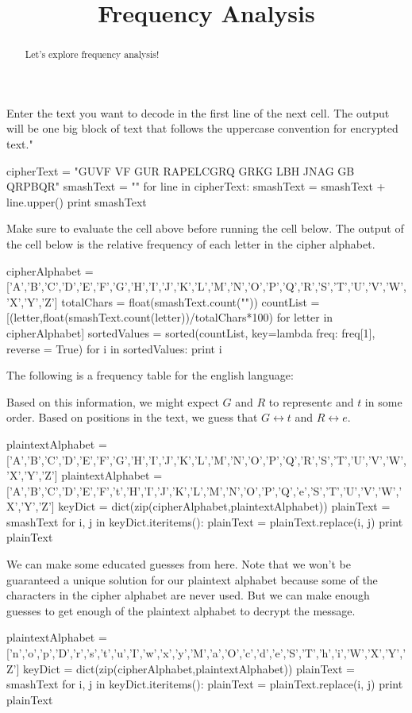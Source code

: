 \documentclass[handout]{ximera}
\title{Frequency Analysis}
\begin{document}
\begin{abstract}{Let's explore frequency analysis!}\end{abstract}
\maketitle

Enter the text you want to decode in the first line of the next cell.  The output will be one big block of text that follows the uppercase convention for encrypted text."

\begin{python}
cipherText = "GUVF VF GUR RAPELCGRQ GRKG LBH JNAG GB QRPBQR"
smashText =  ""
for line in cipherText:
	smashText = smashText + line.upper()
print smashText
\end{python}
Make sure to evaluate the cell above before running the cell below.  The output of the cell below is the relative frequency of each letter in the cipher alphabet.

\begin{python}
cipherAlphabet = ['A','B','C','D','E','F','G','H','I','J','K','L','M','N','O','P','Q','R','S','T','U','V','W','X','Y','Z']
totalChars = float(smashText.count(""))
countList = [(letter,float(smashText.count(letter))/totalChars*100) for letter in cipherAlphabet]
sortedValues = sorted(countList, key=lambda freq: freq[1], reverse = True)
for i in sortedValues:
	print i
\end{python}

The following is a frequency table for the english language:


Based on this information, we might expect $G$ and $R$ to represent$ e$ and $t$ in some order.  Based on positions in the text, we guess that $G \leftrightarrow t$ and $R \leftrightarrow e$.

\begin{python}
plaintextAlphabet = ['A','B','C','D','E','F','G','H','I','J','K','L','M','N','O','P','Q','R','S','T','U','V','W','X','Y','Z']
plaintextAlphabet = ['A','B','C','D','E','F','t','H','I','J','K','L','M','N','O','P','Q','e','S','T','U','V','W','X','Y','Z']
keyDict = dict(zip(cipherAlphabet,plaintextAlphabet))
plainText = smashText
for i, j in keyDict.iteritems():
	plainText = plainText.replace(i, j)
print plainText
\end{python}

We can make some educated guesses from here. Note that we won't be guaranteed a unique solution for our plaintext alphabet because some of the characters in the cipher alphabet are never used.  But we can make enough guesses to get enough of the plaintext alphabet to decrypt the message.
  
\begin{python}
plaintextAlphabet = ['n','o','p','D','r','s','t','u','I','w','x','y','M','a','O','c','d','e','S','T','h','i','W','X','Y','Z']
keyDict = dict(zip(cipherAlphabet,plaintextAlphabet))
plainText = smashText
for i, j in keyDict.iteritems():
	plainText = plainText.replace(i, j)
print plainText
\end{python}
\end{document}
